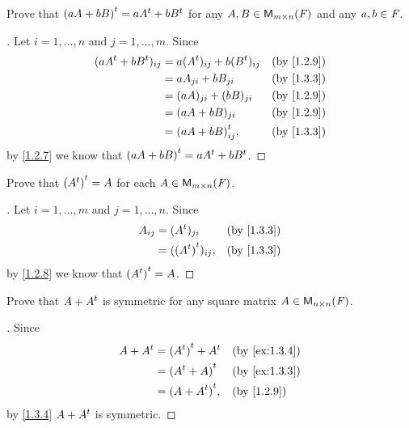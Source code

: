 \exercisesection

\setcounter{ex}{2}
\begin{ex}\label{ex:1.3.3}
  Prove that \({(aA + bB)}^{t} = a{A}^{t} + b{B}^{t}\) for any \(A, B \in \mathsf{M}_{{m} \times n}({\mathit{F}})\) and any \(a, b \in \mathit{F}\).
\end{ex}

\begin{proof}[]
  Let \(i = 1, \dots, n\) and \(j = 1, \dots, m\).
  Since
  \begin{align*}
    (a\tp{A} + b\tp{B})_{i j} & = a(\tp{A})_{i j} + b(\tp{B})_{i j} &  & \text{(by \cref{1.2.9})} \\
                              & = aA_{j i} + bB_{j i}               &  & \text{(by \cref{1.3.3})} \\
                              & = (aA)_{j i} + (bB)_{j i}           &  & \text{(by \cref{1.2.9})} \\
                              & = (aA + bB)_{j i}                   &  & \text{(by \cref{1.2.9})} \\
                              & = \tp{(aA + bB)}_{i j},             &  & \text{(by \cref{1.3.3})}
  \end{align*}
  by \cref{1.2.7} we know that \({(aA + bB)}^{t} = a{A}^{t} + b{B}^{t}\).
\end{proof}

\begin{ex}\label{ex:1.3.4}
  Prove that \({({A}^{t})}^{t} = A\) for each \(A \in \mathsf{M}_{{m} \times n}({\mathit{F}})\).
\end{ex}

\begin{proof}[]
  Let \(i = 1, \dots, m\) and \(j = 1, \dots, n\).
  Since
  \begin{align*}
    A_{i j} & = (\tp{A})_{j i}         &  & \text{(by \cref{1.3.3})} \\
            & = (\tp{(\tp{A})})_{i j}, &  & \text{(by \cref{1.3.3})}
  \end{align*}
  by \cref{1.2.8} we know that \({({A}^{t})}^{t} = A\).
\end{proof}

\begin{ex}\label{ex:1.3.5}
  Prove that \(A + {A}^{t}\) is symmetric for any square matrix \(A \in \mathsf{M}_{{n} \times n}({\mathit{F}})\).
\end{ex}

\begin{proof}[]
  Since
  \begin{align*}
    A + \tp{A} & = \tp{(\tp{A})} + \tp{A} &  & \text{(by \cref{ex:1.3.4})} \\
               & = \tp{(\tp{A} + A)}      &  & \text{(by \cref{ex:1.3.3})} \\
               & = \tp{(A + \tp{A})},     &  & \text{(by \cref{1.2.9})}
  \end{align*}
  by \cref{1.3.4} \(A + {A}^{t}\) is symmetric.
\end{proof}


